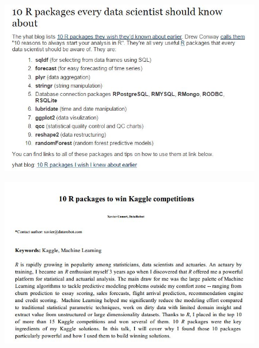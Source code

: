\documentclass{beamer}
\begin{document}
\begin{frame}
	\begin{figure}
		\centering
		\includegraphics[width=1.05\linewidth]{tenpackintro02}
		
	\end{figure}
	
\end{frame}
\begin{frame}
	\begin{figure}
		\centering
		\includegraphics[width=1.05\linewidth]{tenpackintro04}
		
	\end{figure}
	
\end{frame}
\end{document}

